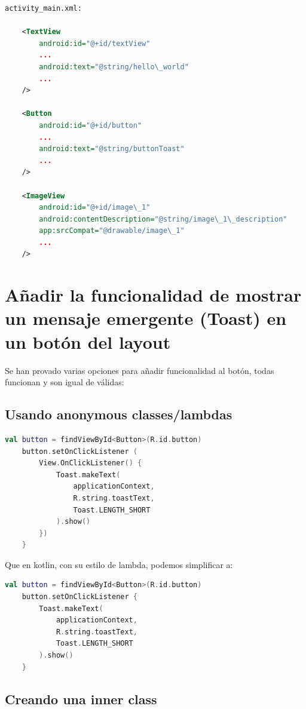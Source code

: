 \documentclass[12pt, letterpaper]{article}
\begin{document}
\begin{lstlisting}[language=XML]
    activity_main.xml:

    <TextView
        android:id="@+id/textView"
        ...
        android:text="@string/hello\_world"
        ...
    />

    <Button
        android:id="@+id/button"
        ...
        android:text="@string/buttonToast"
        ...
    />

    <ImageView
        android:id="@+id/image\_1"
        android:contentDescription="@string/image\_1\_description"
        app:srcCompat="@drawable/image\_1" 
        ...
    />

\end{lstlisting}

\newpage
\section{Añadir la funcionalidad de mostrar un mensaje emergente (Toast) en un botón del layout}
Se han provado varias opciones para añadir funcionalidad al botón, todas funcionan y son igual de válidas:

\subsection{Usando anonymous classes/lambdas}

\begin{lstlisting}[language=Kotlin]
    val button = findViewById<Button>(R.id.button)
    button.setOnClickListener (
        View.OnClickListener() {
            Toast.makeText(
                applicationContext,
                R.string.toastText,
                Toast.LENGTH_SHORT
            ).show()
        })
    }
\end{lstlisting}
Que en kotlin, con su estilo de lambda, podemos simplificar a:

\begin{lstlisting}[language=Kotlin]
    val button = findViewById<Button>(R.id.button)
    button.setOnClickListener {
        Toast.makeText(
            applicationContext,
            R.string.toastText,
            Toast.LENGTH_SHORT
        ).show()
    }
\end{lstlisting}

\subsection{Creando una inner class}
\end{document}
